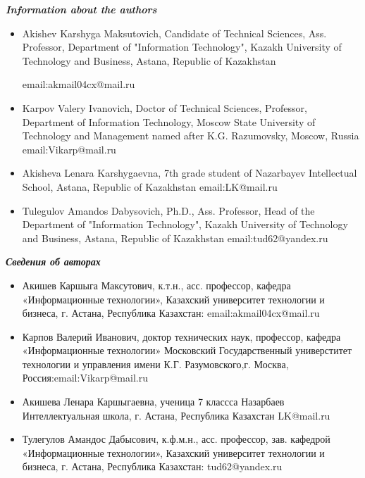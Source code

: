 \emph{{\bfseries Information about the authors}}

\begin{itemize}
\item
Akishev Karshyga Maksutovich, Candidate of Technical Sciences, Ass.
Professor, Department of "Information Technology", Kazakh University of
Technology and Business, Astana, Republic of
Kazakhstan

email:akmail04cx@mail.ru

\item
Karpov Valery Ivanovich, Doctor of Technical Sciences, Professor,
Department of Information Technology, Moscow State University of
Technology and Management named after K.G. Razumovsky, Moscow, Russia
email:Vikarp@mail.ru

\item
Akisheva Lenara Karshygaevna, 7th grade student of Nazarbayev
Intellectual School, Astana, Republic of Kazakhstan email:LK@mail.ru

\item
Tulegulov Amandos Dabysovich, Ph.D., Ass. Professor, Head of the
Department of "Information Technology", Kazakh University of Technology
and Business, Astana, Republic of Kazakhstan email:tud62@yandex.ru
\end{itemize}

\emph{{\bfseries Сведения об авторах}}

\begin{itemize}
\item
Акишев Каршыга Максутович, к.т.н., асс. профессор, кафедра
«Информационные технологии», Казахский университет технологии и бизнеса,
г. Астана, Республика Казахстан: email:akmail04cx@mail.ru

\item
Карпов Валерий Иванович, доктор технических наук, профессор, кафедра
«Информационные технологии» Московский Государственный универститет
технологии и управления имени К.Г. Разумовского,г. Москва,
Россия:email:Vikarp@mail.ru

\item
Акишева Ленара Каршыгаевна, ученица 7 классса Назарбаев Интеллектуальная
школа, г. Астана, Республика Казахстан LK@mail.ru

\item
Тулегулов Амандос Дабысович, к.ф.м.н., асс. профессор, зав. кафедрой
«Информационные технологии», Казахский университет технологии и бизнеса,
г. Астана, Республика Казахстан: tud62@yandex.ru
\end{itemize}
